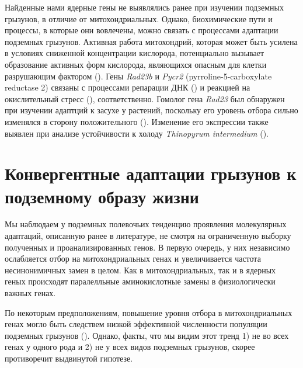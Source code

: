 Найденные нами ядерные гены не выявлялись ранее при изучении подземных грызунов, в отличие от митохондриальных. Однако, биохимические пути и процессы, в которые они вовлечены, можно связать с процессами адаптации подземных грызунов. Активная работа митохондрий, которая может быть усилена в условиях сниженной концентрации кислорода, потенциально вызывает образование активных форм кислорода, являющихся опасным для клетки разрушающим фактором (\cite{Turrens2003}). Гены \textit{Rad23b} и \textit{Pycr2} (pyrroline-5-carboxylate reductase 2) связаны с процессами репарации ДНК (\cite{Pohjoismaki2012}) и реакцией на окислительный стресс (\cite{Kuo2015}), соответственно. Гомолог гена \textit{Rad23} был обнаружен при изучении адаптций к засухе у растений, поскольку его уровень отбора сильно изменялся в сторону положительного (\cite{Zhang2013b}). Изменение его экспрессии также выявлен при анализе устойчивости к холоду \textit{Thinopyrum intermedium} (\cite{Jaikumar2020}).   
       

\section{Конвергентные адаптации грызунов к подземному образу жизни}

Мы наблюдаем у подземных полевочьих тенденцию проявления молекулярных адаптаций, описанную ранее в литературе, не смотря на ограниченную выборку полученных и проанализированных генов. В первую очередь, у них независимо ослабляется отбор на митохондриальных генах и увеличивается частота несинонимичных замен в целом. Как в митохондриальных, так и в ядерных геных происходят паралелльные аминокислотные замены в физиологически важных генах. 


По некоторым предположениям, повышение уровня отбора в митохондриальных генах могло быть следствем низкой эффективной численности популяции подземных грызунов (\cite{Lacey2000}). Однако, факты, что мы видим этот тренд 1) не во всех генах у одного рода и 2) не у всех видов подземных грызунов, скорее противоречит выдвинутой гипотезе. 

